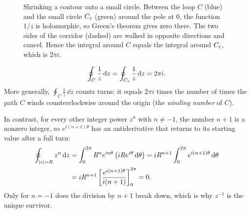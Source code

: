 \begin{figure}[htbp]
\centering
{}
\caption{Shrinking a contour onto a small circle. Between the loop $C$ (blue) and the
small circle $C_\varepsilon$ (green) around the pole at $0$, the function $1/z$ is
holomorphic, so Green's theorem gives zero there. The two sides of the corridor
(dashed) are walked in opposite directions and cancel. Hence the integral around
$C$ equals the integral around $C_\varepsilon$, which is $2\pi i$.}
\label{ch35:fig-cauchy-contour}
\end{figure}
\[
\oint_C \frac{1}{z}\,\mathrm{d} z = \oint_{C_\varepsilon} \frac{1}{z}\,\mathrm{d} z = 2\pi i.
\]
More generally, $\oint_C \frac{1}{z}\,\dd z$ counts turns: it equals $2\pi i$ times the number of times the path $C$ winds counterclockwise around the origin (the \emph{winding number} of $C$).

In contrast, for every other integer power $z^n$ with $n \neq -1$, the number $n+1$ is a nonzero integer, so $e^{i(n+1)\theta}$ has an antiderivative that returns to its starting value after a full turn:
\begin{align*}
\oint_{\lvert z\rvert=R} z^n\,\mathrm{d} z &= \int_0^{2\pi} R^n e^{i n \theta} \left(i R e^{i\theta}\,\mathrm{d}\theta\right)
= i R^{n+1} \int_0^{2\pi} e^{i(n+1)\theta}\,\mathrm{d}\theta\\
&= i R^{n+1}\left[\frac{e^{i(n+1)\theta}}{i(n+1)}\right]_0^{2\pi} = 0.
\end{align*}
Only for $n=-1$ does the division by $n+1$ break down, which is why $z^{-1}$ is the unique survivor.

